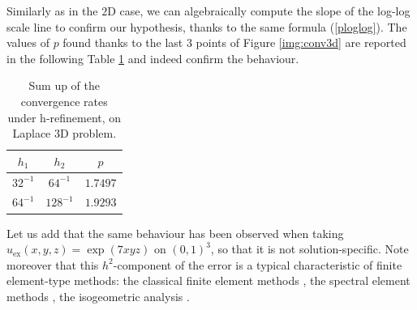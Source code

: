 Similarly as in the $2$D case, we can algebraically compute the slope of the log-log scale line to confirm our hypothesis, thanks to the same formula (\ref{ploglog}). The values of $p$ found thanks to the last $3$ points of Figure \ref{img:conv3d} are reported in the following Table \ref{tableCube} and indeed confirm the behaviour.
\begin{table}[h!]
\begin{center}
\begin{tabular}{|c|c|c|}
\hline
$h_1$ & $h_2$ & $p$ \\
\hline
$32^{-1}$ & $64^{-1}$ & $1.7497$\\
\hline
$64^{-1}$ & $128^{-1}$ & $1.9293$\\
\hline
\end{tabular}
\end{center}
\caption{Sum up of the convergence rates under h-refinement, on Laplace $3$D problem.} \label{tableCube}
\end{table}

Let us add that the same behaviour has been observed when taking $u_\text{ex}(x,y,z)=\exp(7xyz)$ on $(0,1)^3$, so that it is not solution-specific. 
Note moreover that this $h^2$-component of the error is a typical characteristic of finite element-type methods: the classical finite element methods \cite{quarteroni}, the spectral element methods \cite{chqz1}, the isogeometric analysis \cite{igaconv}.